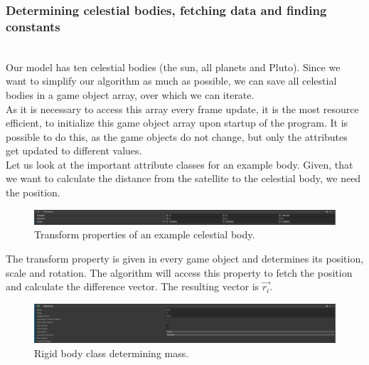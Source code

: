 \documentclass[conference,compsoc]{IEEEtran}
\begin{document}
\subsubsection{Determining celestial bodies, fetching data and finding constants} \hfill \\
Our model has ten celestial bodies (the sun, all planets and Pluto). Since we want to simplify our algorithm as much as possible, we can save all celestial bodies in a game object array, over which we can iterate. \\
As it is necessary to access this array every frame update, it is the most resource efficient, to initialize this game object array upon startup of the program. It is possible to do this, as the game objects do not change, but only the attributes get updated to different values. \\
Let us look at the important attribute classes for an example body. Given, that we want to calculate the distance from the satellite to the celestial body, we need the position.
\begin{figure}[!h]
	
	\includegraphics[width=\columnwidth]{Venus_vectors.png}
	\caption{Transform properties of an example celestial body.}
\end{figure}

The transform property is given in every game object and determines its position, scale and rotation. The algorithm will access this property to fetch the position and calculate the difference vector. The resulting vector is $\vec{r_{i}}$.
\begin{figure}[!h]
	
	\includegraphics[width=\columnwidth]{Venus_rigid.png}
	\caption{Rigid body class determining mass.}
\end{figure}
\end{document}
